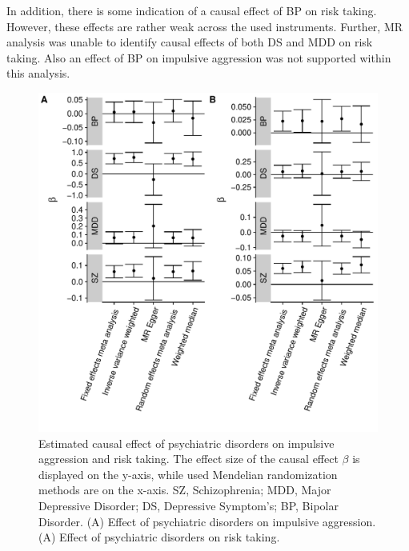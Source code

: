 In addition, there is some indication of a causal effect of BP on risk taking.
However, these effects are rather weak across the used instruments.
Further, MR analysis was unable to identify causal effects of both DS and MDD on risk taking.
Also an effect of BP on impulsive aggression was not supported within this analysis.

\begin{figure}[htpb]
  \centering
  \includegraphics[width=0.9\linewidth]{figures/overall_mr_effect.pdf}
  \caption{Estimated causal effect of psychiatric disorders on impulsive aggression and risk taking.
    The effect size of the causal effect $\beta$ is displayed on the y-axis, while used Mendelian randomization methods are on the x-axis.
    SZ, Schizophrenia; MDD, Major Depressive Disorder; DS, Depressive Symptom's; BP, Bipolar Disorder.
    (A) Effect of psychiatric disorders on impulsive aggression.
    (A) Effect of psychiatric disorders on risk taking.
  }\label{fig:overall_mr_effect}
\end{figure}


